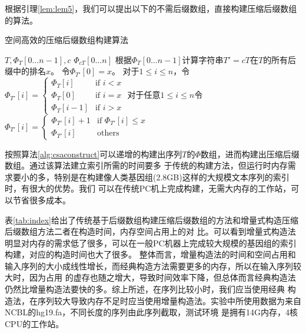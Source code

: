 根据引理\ref{lem:lem5}，我们可以提出以下的不需后缀数组，直接构建压缩后缀数组的算法。
\begin{algorithm}
    \caption{空间高效的压缩后缀数组构建算法}
    \label{alg:csaconstruct}
    \begin{algorithmic}[1]
    \Require $T,\Phi_T[0\ldots n-1],c$
    \Ensure $\Phi_{cT}[0\ldots n]$
        \State 根据$\Phi_T[0\ldots n-1]$计算字符串$T'=cT$在$T$的所有后缀中的排名$x$。
        \State 令$\Phi_{T'}[0]=x$。
        \State 对于$1\leq i\leq n$，令$\Phi_{T'}[i]=\begin{cases} \Phi_T[i] &\mbox{if } i<x\\
                                                                  \Phi_T[0] &\mbox{if } i=x\\
                                                                  \Phi_T[i-1] &\mbox{if } i>x
                                                    \end{cases}$
        \State 对于任意$1\leq i\leq n$令$\Phi_{T'}[i]=\begin{cases} \Phi_{T'}[i]+1 &\mbox{if }\Phi_{T'}[i]\leq x\\
                                                                     \Phi_{T'}[i] &\mbox{others}
                                                      \end{cases}$
    \end{algorithmic}
\end{algorithm}

按照算法\ref{alg:csaconstruct}可以递增的构建出序列$T$的$\Phi$数组，进而构建出压缩后缀数组。通过该算法建立索引所需的时间要多
于传统的构建方法，但运行时内存需求要小的多，特别是在构建像人类基因组(2.8GB)这样的大规模文本序列的索引时，有很大的优势。我们
可以在传统PC机上完成构建，无需大内存的工作站，可以节省很多成本。

表\ref{tab:index}给出了传统基于后缀数组构建压缩后缀数组的方法和增量式构造压缩后缀数组方法二者在构造时间，内存空间占用上的对
比。可以看到增量式构造法明显对内存的需求低了很多，可以在一般PC机器上完成较大规模的基因组的索引构建，对应的构造时间也大了很多。
整体而言，增量构造法的时间和空间占用和输入序列的大小成线性增长，而经典构造方法需要更多的内存，所以在输入序列较大时，因为占用
的虚存也随之增大，导致时间效率下降，但总体而言经典构造法仍然比增量构造法要快的多。综上所述，在序列比较小时，我们应当使用经典
构造法，在序列较大导致内存不足时应当使用增量构造法。实验中所使用数据为来自NCBL的hg19.fa，不同长度的序列由此序列截取，测试环境
是拥有14G内存，4核CPU的工作站。

